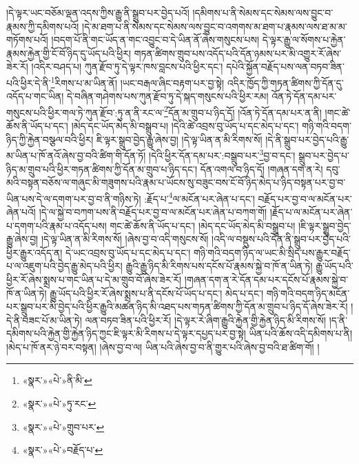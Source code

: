 །དེ་ལྟར་ཡང་བཅོམ་ལྡན་འདས་ཀྱིས་རྒྱུ་ནི་སྒྲུབ་པར་བྱེད་པའོ། །དམིགས་པ་ནི་སེམས་དང་སེམས་ལས་བྱུང་བ་རྣམས་ཀྱི་དམིགས་པའོ། །དེ་མ་ཐག་པ་ནི་སེམས་དང་སེམས་ལས་བྱུང་བ་འགགས་མ་ཐག་པ་རྣམས་ལས་ཐ་མ་མ་གཏོགས་པའོ། །བདག་པོ་ནི་གང་ཡོད་ན་གང་འབྱུང་བ་དེ་ཡིན་ནོ་ཞེས་གསུངས་པས། དེ་ལྟར་རྒྱུ་ལ་སོགས་པ་རྐྱེན་རྣམས་རྐྱེན་གྱི་ངོ་བོ་ཉིད་དུ་ཡོད་པའི་ཕྱིར། གཏན་ཚིགས་གྲུབ་པས་འདོད་པའི་དོན་ཉམས་པར་མི་འགྱུར་རོ་ཞེས་ཟེར་རོ། །འདིར་བཤད་པ། ཀུན་རྫོབ་ཏུ་དེ་ལྟར་ཁས་བླངས་པའི་ཕྱིར་དང་། དཔེའི་སྐྱོན་བརྗོད་པས་ལན་བཏབ་ཟིན་པའི་ཕྱིར་དེ་ནི་\footnote{«སྣར་»«པེ་»ནི་མི་}རིགས་པ་མ་ཡིན་ནོ། །ཡང་བརྒལ་ཞིང་བརྟག་པར་བྱ་སྟེ། འདིར་ཁྱོད་ཀྱི་གཏན་ཚིགས་ཀྱི་དོན་དུ་འདོད་པ་གང་ཡིན། དེ་བཞིན་གཤེགས་པས་ཀུན་རྫོབ་ཏུ་དེ་སྐད་གསུངས་པའི་ཕྱིར་རམ། འོན་ཏེ་དོན་དམ་པར་གསུངས་པའི་ཕྱིར་གལ་ཏེ་ཀུན་རྫོབ་:ཏུ་ན་ནི་རང་ལ་\footnote{«སྣར་»«པེ་»ཏུ་རང་}དོན་མ་གྲུབ་པ་ཉིད་དོ། །འོན་ཏེ་དོན་དམ་པར་ན་ནི། །གང་ཚེ་ཆོས་ནི་ཡོད་པ་དང་། །མེད་དང་ཡོད་མེད་མི་བསྒྲུབ་པ། །དེའི་ཚེ་འབྲས་བུ་ཡོད་པ་དང་མེད་པ་དང་། གཉི་གའི་བདག་ཉིད་ཀྱི་རྐྱེན་བསྩལ་བའི་ཕྱིར། ཇི་ལྟར་སྒྲུབ་བྱེད་རྒྱུ་ཞེས་བྱ། །དེ་ལྟ་ཡིན་ན་མི་རིགས་སོ། །དེ་ནི་སྒྲུབ་པར་བྱེད་པའི་རྒྱུ་མ་ཡིན་པ་ཁོ་ནའོ་ཞེས་བྱ་བའི་ཚིག་གི་དོན་ཏོ། །དེའི་ཕྱིར་དོན་དམ་པར་:བསྒྲུབ་པར་\footnote{«སྣར་»«པེ་»གྲུབ་པར་}བྱ་བ་དང་། སྒྲུབ་པར་བྱེད་པ་ཉིད་མ་གྲུབ་པའི་ཕྱིར་གཏན་ཚིགས་ཀྱི་དོན་མ་གྲུབ་པ་ཉིད་དང་། དོན་འགལ་བ་ཉིད་དོ། །གཞན་དག་ན་རེ། དབུ་མའི་བསྟན་བཅོས་ལ་གཞུང་མི་གཟུགས་པའི་རྣམ་པ་ཡོངས་སུ་བཟུང་བས་ངོ་བོ་ཉིད་མེད་པ་ཉིད་བསྟན་པར་བྱ་བ་ཡིན་པས་དེ་ལ་དགག་པར་བྱ་བ་ནི་གཉིས་ཏེ། :རྗོད་པ་\footnote{«སྣར་»«པེ་»བརྗོད་པ་}ལ་མངོན་པར་ཞེན་པ་དང་། བརྗོད་པར་བྱ་བ་ལ་མངོན་པར་ཞེན་པའོ། །དེ་ལ་སྐྱེ་བ་བཀག་པས་ནི་བརྗོད་པར་བྱ་བ་ལ་མངོན་པར་ཞེན་པ་བཀག་གོ། །རྗོད་པ་ལ་མངོན་པར་ཞེན་པ་དགག་པའི་རྣམ་པ་འདོད་པས། གང་ཚེ་ཆོས་ནི་ཡོད་པ་དང་། །མེད་དང་ཡོད་མེད་མི་བསྒྲུབ་པ། །ཇི་ལྟར་སྒྲུབ་བྱེད་རྒྱུ་ཞེས་བྱ། །དེ་ལྟ་ཡིན་ན་མི་རིགས་སོ། །ཞེས་བྱ་བ་འདི་གསུངས་སོ། །འདི་ལ་བསྡུས་པའི་དོན་ནི་སྒྲུབ་པར་བྱེད་པའི་ཕྱིར་རྒྱུར་འདོད་ན། དེ་ཡང་འབྲས་བུ་ཡོད་པ་དང་མེད་པ་དང་། གཉི་གའི་བདག་ཉིད་ལ་ཡང་མི་སྲིད་པས་རྒྱུར་བརྗོད་པ་ལ་འཇུག་པའི་བྱེད་རྒྱུ་མེད་པའི་ཕྱིར། རྒྱུའི་རྒྱུ་ཉིད་མི་རིགས་པས་དངོས་པོ་རྣམས་སྐྱེ་བ་ཁོ་ན་ཡིན་ཏེ། རྒྱུ་ཡོད་པའི་ཕྱིར་རོ་ཞེས་སྨྲས་པ་གང་ཡིན་པ་དེ་མ་གྲུབ་བོ་ཞེས་ཟེར་རོ། །གཞན་དག་ན་རེ་དོན་དམ་པར་དངོས་པོ་རྣམས་སྐྱེ་བ་ཁོ་ན་ཡིན་ཏེ། རྒྱུ་ཡོད་པའི་ཕྱིར་རོ་ཞེས་སྨྲས་པ་ནི་དངོས་པོ་ཡོད་པ་དང་། མེད་པ་དང་། གཉི་གའི་བདག་ཉིད་མངོན་པར་སྒྲུབ་པར་མི་བྱེད་པའི་ཕྱིར་རྒྱུའི་མཚན་ཉིད་མི་འཐད་པས་གཏན་ཚིགས་ཀྱི་དོན་མ་གྲུབ་པ་ཉིད་དོ་ཞེས་ཟེར་རོ། །དེ་ནི་བཟང་པོ་མ་ཡིན་ཏེ། ལན་བཏབ་ཟིན་པའི་ཕྱིར་རོ། །དེ་ལྟར་རེ་ཞིག་རྒྱུའི་རྐྱེན་གྱི་རྐྱེན་ཉིད་མི་རིགས་སོ། །ད་ནི་དམིགས་པའི་རྐྱེན་གྱི་རྐྱེན་ཉིད་ཀྱང་ཇི་ལྟར་མི་རིགས་པ་དེ་ལྟར་དཔྱད་པར་བྱ་སྟེ། ཡིན་པའི་ཆོས་འདི་དམིགས་པ་ནི། །མེད་པ་ཁོ་ནར་ཉེ་བར་བསྟན། །ཞེས་བྱ་བ་ལ། ཡིན་པའི་ཞེས་བྱ་བ་ནི་གྱུར་པའི་ཞེས་བྱ་བའི་ཐ་ཚིག་གོ། །
